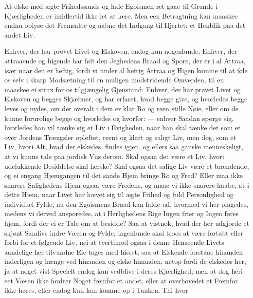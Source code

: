 \documentclass[12pt,a4paper]{book}
\newcommand{\apage}[1]{\marginnote{\footnotesize\textit{[#1]}}}
\begin{document}
At elske med ægte Frihedssands og lade Egoismen ret gaae til Grunde i
Kjærligheden er imidlertid ikke let at lære. Men een Betragtning kan
maaskee endnu oplyse det Fremsatte og aabne det Indgang til Hjertet: et
Henblik paa det andet Liv.

Enhver, der har prøvet Livet og Elskoven, endog kun nogenlunde, Enhver,
der attraaende og higende har følt den Jeghedens Braad og Spore, der er
i al Attraa, især naar den er heftig, fordi vi under al heftig Attraa og
Higen komme til at føle os selv i skarp Modsætning til en muligen
modstridende Omverden, til en maaskee ei strax for os tilgjængelig
Gjenstand: Enhver, der har prøvet Livet og Elskoven og begges Skjæbner,
og har erfaret, hvad begge give, og hvorledes begge leves og nydes, om
der overalt i dem er klar Ro og reen stille Nøie, eller om de kunne
forurolige begge og hvorledes og hvorfor: --- enhver Saadan spørge sig,
hvorledes han vil tænke sig et Liv i Evigheden, naar han skal tænke det
som et over Jordens Trængsler opløftet, reent og klart og saligt Liv,
men dog, som et Liv, hvori Alt, hvad der elskedes, findes igjen, og
ellers saa ganske menneskeligt, at vi kunne tale paa jordisk Viis derom.
Skal ogsaa det være et Liv, hvori udelukkende Besiddelse skal herske?
Skal ogsaa det salige Liv være et brændende, og ei engang \apage{68} Hjemgangen til
det sande Hjem bringe Ro og Fred? Eller maa ikke snarere Salighedens
Hjem ogsaa være Fredens, og maae vi ikke snarere haabe, at i dette Hjem,
naar Livet har hævet sig til ægte Frihed og fuld Personlighed og
iudividuel Fylde, nu den Egoismens Braad kan falde ud, hvormed vi her
plagedes, medens vi derved ansporedes, at i Herlighedens Rige Ingen
frier og Ingen føres hjem, fordi der ei er Tale om at besidde? Saa at
vistnok, hvad der her udgjorde et skjønt Samlivs indre Væsen og Fylde,
ingenlunde skal troes at være fortabt eller forbi for et følgeude Liv,
nei at tvertimod ogsaa i denne Henseende Livets aandelige her tilvundne
Eie tages med hisset; saa at Elskende forstaae hinanden inderligen og
hænge ved hinanden og elske hinanden, netop fordi de elskedes her, ja at
noget vist Specielt endog kan vedblive i deres Kjærlighed; men at dog
heri eet Væsen ikke fordrer Noget fremfor et andet, eller at overhovedet
et Fremfor ikke høres, eller endog kun kan komme op i Tanken. Thi hvor
\end{document}
